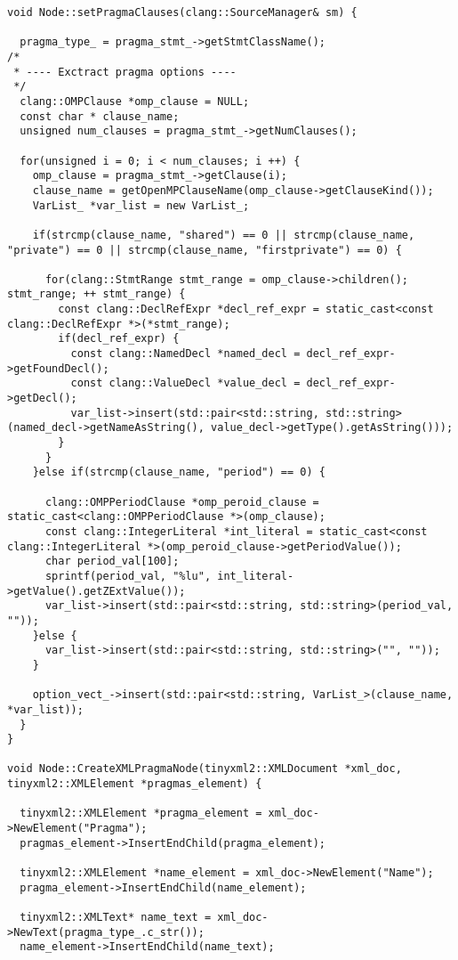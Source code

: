 \documentclass[a4paper,10pt,twoside]{book}
\begin{document}
\begin{lstlisting}[language=CCC, caption=pragma\_handler/Node.cpp]
void Node::setPragmaClauses(clang::SourceManager& sm) {
  
  pragma_type_ = pragma_stmt_->getStmtClassName();
/*
 * ---- Exctract pragma options ----
 */
  clang::OMPClause *omp_clause = NULL;
  const char * clause_name;
  unsigned num_clauses = pragma_stmt_->getNumClauses();
  
  for(unsigned i = 0; i < num_clauses; i ++) {
    omp_clause = pragma_stmt_->getClause(i);
    clause_name = getOpenMPClauseName(omp_clause->getClauseKind());
    VarList_ *var_list = new VarList_;

    if(strcmp(clause_name, "shared") == 0 || strcmp(clause_name, "private") == 0 || strcmp(clause_name, "firstprivate") == 0) {
      
      for(clang::StmtRange stmt_range = omp_clause->children(); stmt_range; ++ stmt_range) {
        const clang::DeclRefExpr *decl_ref_expr = static_cast<const clang::DeclRefExpr *>(*stmt_range);
        if(decl_ref_expr) {
          const clang::NamedDecl *named_decl = decl_ref_expr->getFoundDecl();
          const clang::ValueDecl *value_decl = decl_ref_expr->getDecl();
          var_list->insert(std::pair<std::string, std::string>(named_decl->getNameAsString(), value_decl->getType().getAsString()));
        }
      }
    }else if(strcmp(clause_name, "period") == 0) {

      clang::OMPPeriodClause *omp_peroid_clause = static_cast<clang::OMPPeriodClause *>(omp_clause);
      const clang::IntegerLiteral *int_literal = static_cast<const clang::IntegerLiteral *>(omp_peroid_clause->getPeriodValue());
      char period_val[100];
      sprintf(period_val, "%lu", int_literal->getValue().getZExtValue());
      var_list->insert(std::pair<std::string, std::string>(period_val, ""));
    }else {
      var_list->insert(std::pair<std::string, std::string>("", ""));
    }

    option_vect_->insert(std::pair<std::string, VarList_>(clause_name, *var_list));
  }
}

void Node::CreateXMLPragmaNode(tinyxml2::XMLDocument *xml_doc, tinyxml2::XMLElement *pragmas_element) {
  
  tinyxml2::XMLElement *pragma_element = xml_doc->NewElement("Pragma");
  pragmas_element->InsertEndChild(pragma_element);

  tinyxml2::XMLElement *name_element = xml_doc->NewElement("Name");
  pragma_element->InsertEndChild(name_element);
  
  tinyxml2::XMLText* name_text = xml_doc->NewText(pragma_type_.c_str());
  name_element->InsertEndChild(name_text);


\end{lstlisting}
\end{document}
